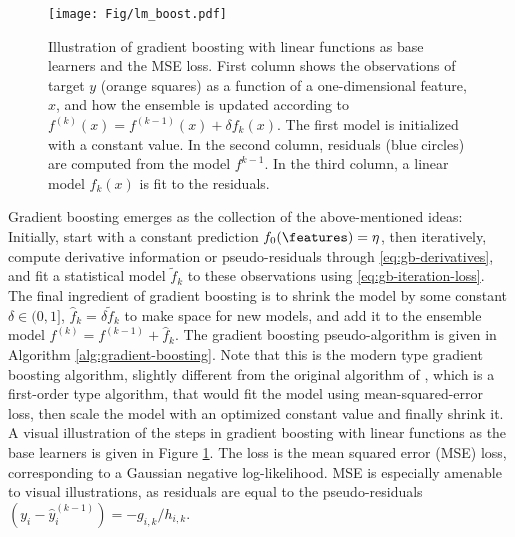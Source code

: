 
\begin{figure}[t!]
	\centering
	\texttt{[image: Fig/lm\_boost.pdf]}
	\caption{
		\label{fig:lm-boost}
		Illustration of gradient boosting with linear functions as base learners
		and the MSE loss.
		First column shows the observations of target $y$ (orange squares) as a function of a one-dimensional feature, $x$, and how the ensemble is updated according to $f^{(k)}(x)=f^{(k-1)}(x)+\delta f_k(x)$.
		The first model is initialized with a constant value.
		In the second column, residuals (blue circles) are computed from the model $f^{k-1}$.
		In the third column, a linear model $f_k(x)$ is fit to the residuals.
	}
\end{figure}
Gradient boosting emerges as the collection of the above-mentioned ideas: Initially, start with a constant prediction $f_0(\features)=\eta$, then iteratively, compute derivative information or pseudo-residuals through \eqref{eq:gb-derivatives}, and fit a statistical model $\tilde{f}_k$ to these observations using \eqref{eq:gb-iteration-loss}.
The final ingredient of gradient boosting is to shrink the model by some constant $\delta\in(0,1]$, $\hat{f}_k=\delta \tilde{f}_k$ to make space for new models, and add it to the ensemble model $f^{(k)}=f^{(k-1)}+\hat{f}_k$.
The gradient boosting pseudo-algorithm is given in Algorithm \ref{alg:gradient-boosting}.
Note that this is the modern type gradient boosting algorithm, slightly different from the original algorithm of \citet{friedman2001greedy}, which is a first-order type algorithm, that would fit the model using mean-squared-error loss, then scale the model with an optimized constant value and finally shrink it.
A visual illustration of the steps in gradient boosting with linear functions as the base learners is given in Figure \ref{fig:lm-boost}.
The loss is the mean squared error (MSE) loss, corresponding to a Gaussian negative log-likelihood. 
MSE is especially amenable to visual illustrations,
as residuals are equal to the pseudo-residuals $(y_i-\hat{y}_i^{(k-1)}) =  -g_{i,k}/h_{i,k}$.



